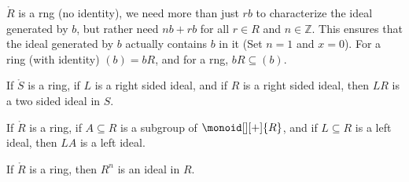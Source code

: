 \documentclass{book}                                                           %
\begin{document}
            $\ring{R}$ is a rng (no identity), we need more than just
            $rb$ to characterize the ideal generated by $b$, but rather
            need $nb+rb$ for all $r\in{R}$ and $n\in\mathbb{Z}$. This
            ensures that the ideal generated by $b$ actually contains $b$ in
            it (Set $n=1$ and $x=0$). For a ring (with identity)
            $(b)=bR$, and for a rng, $bR\subseteq(b)$.
            \begin{theorem}
                If $\ring{S}$ is a ring, if $L$ is a right sided ideal,
                and if $R$ is a right sided ideal, then $LR$ is a two sided
                ideal in $S$.
            \end{theorem}
            \begin{theorem}
                If $\ring{R}$ is a ring, if $A\subseteq{R}$ is a subgroup of
                $\monoid[][+]{R}$, and if $L\subseteq{R}$ is a left ideal,
                then $LA$ is a left ideal.
            \end{theorem}
            \begin{theorem}
                If $\ring{R}$ is a ring, then $R^{n}$ is an ideal in $R$.
            \end{theorem}
\end{document}
